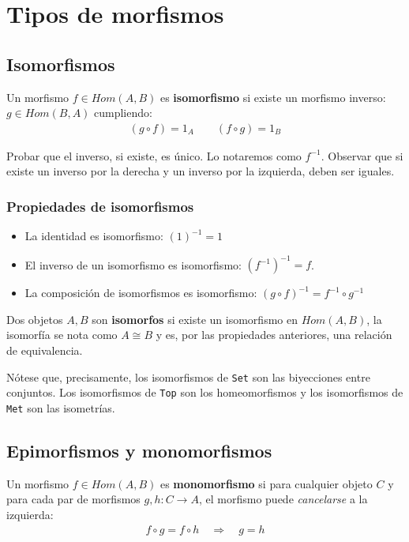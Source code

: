 \documentclass[11pt, fleqn, spanish]{book}
\begin{document}
\chapter{Tipos de morfismos}
  \section {Isomorfismos}
    \begin{definition}
      Un morfismo $f \in Hom(A,B)$ es \textbf{isomorfismo} si existe un morfismo inverso:
	$g \in Hom(B,A)$ cumpliendo:
      \begin{gather*}
	(g \circ f) = 1_A \qquad (f \circ g) = 1_B
      \end{gather*}
    \end{definition}


    
    \begin{exercise} 
      Probar que el inverso, si existe, es único. Lo notaremos como $f^{-1}$. Observar que si
      existe un inverso por la derecha y un inverso por la izquierda, deben ser iguales.
    \end{exercise}

    
    \subsection{Propiedades de isomorfismos}
      \begin{itemize}
       \item La identidad es isomorfismo: $(1)^{-1} = 1$ 
       \item El inverso de un isomorfismo es isomorfismo: $(f^{-1})^{-1} = f$.
       \item La composición de isomorfismos es isomorfismo: $(g \circ f)^{-1} = f^{-1} \circ g^{-1}$
      \end{itemize}

    Dos objetos $A,B$ son \textbf{isomorfos} si existe un isomorfismo en $Hom(A,B)$, la isomorfía se
    nota como $A \cong B$ y es, por las propiedades anteriores, una relación de equivalencia.
      
    Nótese que, precisamente, los isomorfismos de \texttt{Set} son las biyecciones entre conjuntos.
    Los isomorfismos de \texttt{Top} son los homeomorfismos y los isomorfismos de \texttt{Met} son
    las isometrías.
    
  \section {Epimorfismos y monomorfismos}
    \begin{definition} 
      Un morfismo $f \in Hom(A,B)$ es \textbf{monomorfismo} si para cualquier objeto $C$ y
      para cada par de morfismos $g,h: C \rightarrow A$, el morfismo puede \textit{cancelarse} a la izquierda:
      \begin{gather*}
	f \circ g = f \circ h \quad \Rightarrow \quad g = h
      \end{gather*}
    \end{definition}
\end{document}
